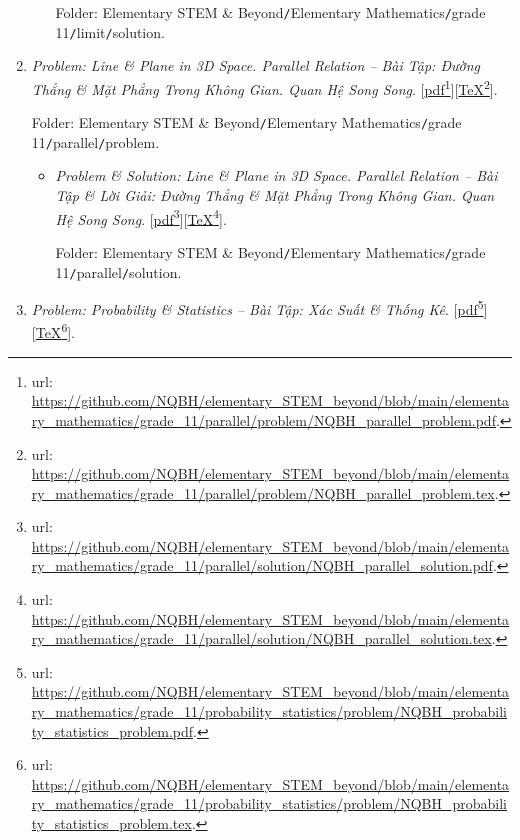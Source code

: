 \documentclass[12pt,twoside]{book}
\begin{document}
\begin{enumerate}
\begin{itemize}
		Folder: {\sf Elementary STEM \& Beyond{\tt/}Elementary Mathematics{\tt/}grade 11{\tt/}limit{\tt/}solution}.
	\end{itemize}
	\item {\it Problem: Line \& Plane in 3D Space. Parallel Relation -- Bài Tập: Đường Thẳng \& Mặt Phẳng Trong Không Gian. Quan Hệ Song Song}. [\href{https://github.com/NQBH/elementary_STEM_beyond/blob/main/elementary_mathematics/grade_11/parallel/problem/NQBH_parallel_problem.pdf}{pdf}\footnote{{\sc url}: \url{https://github.com/NQBH/elementary_STEM_beyond/blob/main/elementary_mathematics/grade_11/parallel/problem/NQBH_parallel_problem.pdf}.}][\href{https://github.com/NQBH/elementary_STEM_beyond/blob/main/elementary_mathematics/grade_11/parallel/problem/NQBH_parallel_problem.tex}{\TeX}\footnote{{\sc url}: \url{https://github.com/NQBH/elementary_STEM_beyond/blob/main/elementary_mathematics/grade_11/parallel/problem/NQBH_parallel_problem.tex}.}].
	
	Folder: {\sf Elementary STEM \& Beyond{\tt/}Elementary Mathematics{\tt/}grade 11{\tt/}parallel{\tt/}problem}.
	\begin{itemize}
		\item {\it Problem \& Solution: Line \& Plane in 3D Space. Parallel Relation -- Bài Tập \& Lời Giải: Đường Thẳng \& Mặt Phẳng Trong Không Gian. Quan Hệ Song Song}. [\href{https://github.com/NQBH/elementary_STEM_beyond/blob/main/elementary_mathematics/grade_11/parallel/solution/NQBH_parallel_solution.pdf}{pdf}\footnote{{\sc url}: \url{https://github.com/NQBH/elementary_STEM_beyond/blob/main/elementary_mathematics/grade_11/parallel/solution/NQBH_parallel_solution.pdf}.}][\href{https://github.com/NQBH/elementary_STEM_beyond/blob/main/elementary_mathematics/grade_11/parallel/solution/NQBH_parallel_solution.tex}{\TeX}\footnote{{\sc url}: \url{https://github.com/NQBH/elementary_STEM_beyond/blob/main/elementary_mathematics/grade_11/parallel/solution/NQBH_parallel_solution.tex}.}].
		
		Folder: {\sf Elementary STEM \& Beyond{\tt/}Elementary Mathematics{\tt/}grade 11{\tt/}parallel{\tt/}solution}.
	\end{itemize}
	\item {\it Problem: Probability \& Statistics -- Bài Tập: Xác Suất \& Thống Kê}. [\href{https://github.com/NQBH/elementary_STEM_beyond/blob/main/elementary_mathematics/grade_11/probability_statistics/problem/NQBH_probability_statistics_problem.pdf}{pdf}\footnote{{\sc url}: \url{https://github.com/NQBH/elementary_STEM_beyond/blob/main/elementary_mathematics/grade_11/probability_statistics/problem/NQBH_probability_statistics_problem.pdf}.}][\href{https://github.com/NQBH/elementary_STEM_beyond/blob/main/elementary_mathematics/grade_11/probability_statistics/problem/NQBH_probability_statistics_problem.tex}{\TeX}\footnote{{\sc url}: \url{https://github.com/NQBH/elementary_STEM_beyond/blob/main/elementary_mathematics/grade_11/probability_statistics/problem/NQBH_probability_statistics_problem.tex}.}].
	

\end{enumerate}
\end{document}
